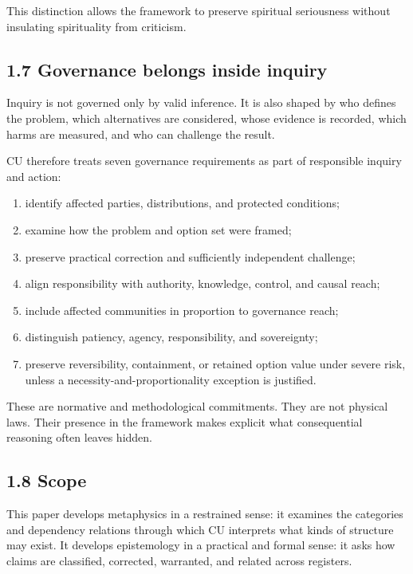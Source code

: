 \documentclass[
  11pt,
]{article}
\providecommand{\tightlist}{%
  \setlength{\itemsep}{0pt}\setlength{\parskip}{0pt}}
\begin{document}
This distinction allows the framework to preserve spiritual seriousness
without insulating spirituality from criticism.

\subsection{1.7 Governance belongs inside
inquiry}\label{governance-belongs-inside-inquiry}

Inquiry is not governed only by valid inference. It is also shaped by
who defines the problem, which alternatives are considered, whose
evidence is recorded, which harms are measured, and who can challenge
the result.

CU therefore treats seven governance requirements as part of responsible
inquiry and action:

\begin{enumerate}
\def\labelenumi{\arabic{enumi}.}
\tightlist
\item
  identify affected parties, distributions, and protected conditions;
\item
  examine how the problem and option set were framed;
\item
  preserve practical correction and sufficiently independent challenge;
\item
  align responsibility with authority, knowledge, control, and causal
  reach;
\item
  include affected communities in proportion to governance reach;
\item
  distinguish patiency, agency, responsibility, and sovereignty;
\item
  preserve reversibility, containment, or retained option value under
  severe risk, unless a necessity-and-proportionality exception is
  justified.
\end{enumerate}

These are normative and methodological commitments. They are not
physical laws. Their presence in the framework makes explicit what
consequential reasoning often leaves hidden.

\subsection{1.8 Scope}\label{scope}

This paper develops metaphysics in a restrained sense: it examines the
categories and dependency relations through which CU interprets what
kinds of structure may exist. It develops epistemology in a practical
and formal sense: it asks how claims are classified, corrected,
warranted, and related across registers.
\end{document}
